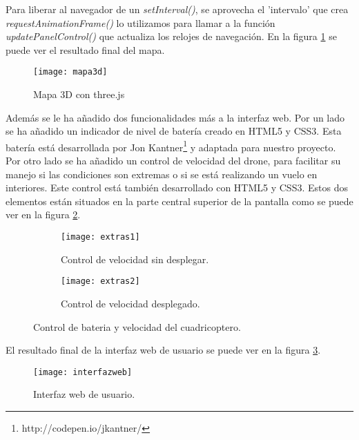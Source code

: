 Para liberar al navegador de un \emph{setInterval()}, se aprovecha el 'intervalo' que crea \emph{requestAnimationFrame()} lo utilizamos para llamar a la función \emph{updatePanelControl()} que actualiza los relojes de navegación. En la figura \ref{fig:mapa3d} se puede ver el resultado final del mapa.\\

\begin{figure}[h!]
\centering
\texttt{[image: mapa3d]}
\caption{Mapa 3D con three.js}
\label{fig:mapa3d}
\end{figure}


Además se le ha añadido dos funcionalidades más a la interfaz web. Por un lado se ha añadido un indicador de nivel de batería creado en HTML5 y CSS3. Esta batería está desarrollada por Jon Kantner\footnote{http://codepen.io/jkantner/}\cite{bateria} y adaptada para nuestro proyecto. Por otro lado se ha añadido un control de velocidad del drone, para facilitar su manejo si las condiciones son extremas o si se está realizando un vuelo en interiores. Este control está también desarrollado con HTML5 y CSS3. Estos dos elementos están situados en la parte central superior de la pantalla como se puede ver en la figura \ref{fig:bateriayvelocidad}.\\

\begin{figure}[h!]
\centering
  \begin{subfigure}[]{60mm}
    \texttt{[image: extras1]}
    \caption{Control de velocidad sin desplegar.} 
  \end{subfigure}
  \hspace{5pt}
  \begin{subfigure}[]{60mm}
    \texttt{[image: extras2]}
    \caption{Control de velocidad desplegado.}
  \end{subfigure}
  \caption{Control de bateria y velocidad del cuadricoptero.}\label{fig:bateriayvelocidad}
\end{figure}


El resultado final de la interfaz web de usuario se puede ver en la figura \ref{fig:interfazweb}.


\begin{figure}[h!]
\centering
\texttt{[image: interfazweb]}
\caption{Interfaz web de usuario.}
\label{fig:interfazweb}
\end{figure}

